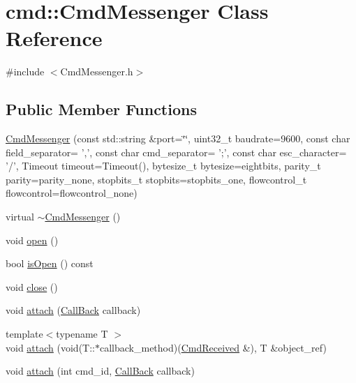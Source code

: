 \hypertarget{classcmd_1_1_cmd_messenger}{\section{cmd\+:\+:Cmd\+Messenger Class Reference}
\label{classcmd_1_1_cmd_messenger}
}


{\ttfamily \#include $<$Cmd\+Messenger.\+h$>$}

\subsection*{Public Member Functions}
\begin{DoxyCompactItemize}
\item 
\hyperlink{classcmd_1_1_cmd_messenger_aba80ae7cc283a24b7afa08c18f89af0f}{Cmd\+Messenger} (const std\+::string \&port=\char`\"{}\char`\"{}, uint32\+\_\+t baudrate=9600, const char field\+\_\+separator= ',', const char cmd\+\_\+separator= ';', const char esc\+\_\+character= '/', Timeout timeout=Timeout(), bytesize\+\_\+t bytesize=eightbits, parity\+\_\+t parity=parity\+\_\+none, stopbits\+\_\+t stopbits=stopbits\+\_\+one, flowcontrol\+\_\+t flowcontrol=flowcontrol\+\_\+none)
\item 
virtual \hyperlink{classcmd_1_1_cmd_messenger_aa92b483212121faffeb02b7a63450ad0}{$\sim$\+Cmd\+Messenger} ()
\item 
void \hyperlink{classcmd_1_1_cmd_messenger_adb4617437e81ccb39b1d314b83db8f6c}{open} ()
\item 
bool \hyperlink{classcmd_1_1_cmd_messenger_a38dab46f4b3c0c56e8dad6e91b9500c8}{is\+Open} () const 
\item 
void \hyperlink{classcmd_1_1_cmd_messenger_a3a08819cae57dd6c9f7515ebae923696}{close} ()
\item 
void \hyperlink{classcmd_1_1_cmd_messenger_a92df6db7de8ce3d685d4da21b7c76d77}{attach} (\hyperlink{namespacecmd_a20b40ecd3ba46130eef6c125f70c4121}{Call\+Back} callback)
\item 
{\footnotesize template$<$typename T $>$ }\\void \hyperlink{classcmd_1_1_cmd_messenger_a5af33d07f7074623701f822a6cb7ee81}{attach} (void(T\+::$\ast$callback\+\_\+method)(\hyperlink{classcmd_1_1_cmd_received}{Cmd\+Received} \&), T \&object\+\_\+ref)
\item 
void \hyperlink{classcmd_1_1_cmd_messenger_abbc2aa2a6bc95960215eeaa88c4533a4}{attach} (int cmd\+\_\+id, \hyperlink{namespacecmd_a20b40ecd3ba46130eef6c125f70c4121}{Call\+Back} callback)

\end{DoxyCompactItemize}

